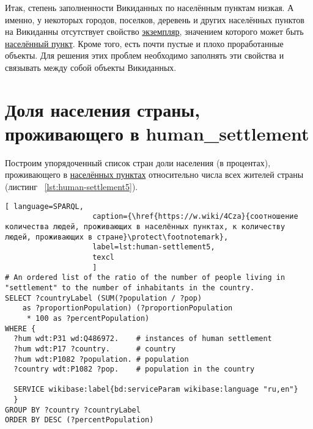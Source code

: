 
Итак, степень заполненности Викиданных по населённым пунктам низкая. А именно, у некоторых городов, поселков, деревень и других населённых пунктов на Викиданны отсутствует свойство \href{http://www.wikidata.org/entity/Q21503252}{экземпляр}, значением которого может быть \href{http://www.wikidata.org/entity/Q486972}{населённый пункт}. Кроме того, есть почти пустые и плохо проработанные объекты. Для решения этих проблем необходимо заполнять эти свойства и связывать между собой объекты Викиданных.

\section{Доля населения страны, проживающего в human\_settlement}

Построим упорядоченный список стран доли населения (в процентах), проживающего в \href{http://www.wikidata.org/entity/Q486972}{населённых пунктах} относительно числа всех жителей страны (листинг ~\protect\ref{lst:human-settlement5}).

\begin{lstlisting}[ language=SPARQL, 
                    caption={\href{https://w.wiki/4Cza}{соотношение количества людей, проживающих в населённых пунктах, к количеству людей, проживающих в стране}\protect\footnotemark},
                    label=lst:human-settlement5,
                    texcl 
                    ]
# An ordered list of the ratio of the number of people living in 
"settlement" to the number of inhabitants in the country.
SELECT ?countryLabel (SUM(?population / ?pop) 
	as ?proportionPopulation) (?proportionPopulation
	 * 100 as ?percentPopulation)
WHERE {
  ?hum wdt:P31 wd:Q486972.    # instances of human settlement  
  ?hum wdt:P17 ?country.      # country 
  ?hum wdt:P1082 ?population. # population
  ?country wdt:P1082 ?pop.    # population in the country

  SERVICE wikibase:label{bd:serviceParam wikibase:language "ru,en"}
  }
GROUP BY ?country ?countryLabel
ORDER BY DESC (?percentPopulation)
\end{lstlisting}%

